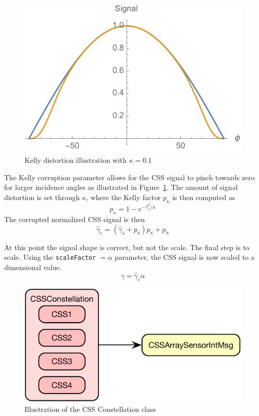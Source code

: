 \begin{figure}[htb]
	\centerline{
		\includegraphics[]{Figures/kelly}
	}
	\caption{Kelly distortion illustration with $\kappa = 0.1$}
	\label{fig:kelly}
\end{figure}
The Kelly corruption parameter allows for the CSS signal to pinch towards zero for larger incidence angles as illustrated in Figure~\ref{fig:kelly}.  The amount of signal distortion is set through $\kappa$, where the Kelly factor $p_{\kappa}$ is then computed as 
\begin{equation}
	p_{\kappa} = 1 - e^{-\hat\gamma_{s}^{2}/\kappa}
\end{equation}
The corrupted normalized CSS signal is then
\begin{equation}
	\hat \gamma_{c} = (\hat\gamma_{s} + p_{a}) p_{\kappa} + p_{n}
\end{equation}

At this point the signal shape is correct, but not the scale.  The final step is to scale.  Using the {\tt scaleFactor} $=\alpha$ parameter, the CSS signal is now scaled to a dimensional value.  
\begin{equation}
	\gamma = \hat{\gamma}_{c} \alpha
\end{equation}


\begin{figure}[htb]
	\centerline{
	\includegraphics[]{Figures/moduleDiagramConstellation}
	}
	\caption{Illustration of the CSS Constellation class}
	\label{fig:moduleDiagramConstellation}
\end{figure}
